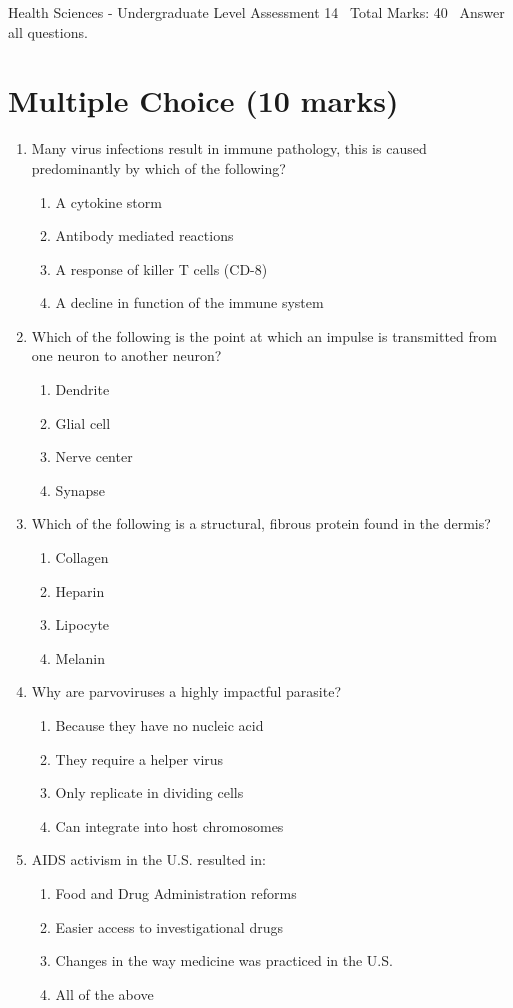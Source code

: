 \documentclass[12pt]{article}
\begin{document}
\begin{center}
Health Sciences - Undergraduate Level Assessment 14 \
Total Marks: 40 \
Answer all questions.
\end{center}

\section*{Multiple Choice (10 marks)}
\begin{enumerate}[label=\arabic*.]
\item Many virus infections result in immune pathology, this is caused predominantly by which of the following?
\begin{enumerate}[label=(\alph*)]
    \item A cytokine storm
    \item Antibody mediated reactions
    \item A response of killer T cells (CD-8)
    \item A decline in function of the immune system
\end{enumerate}
\item Which of the following is the point at which an impulse is transmitted from one neuron to another neuron?
\begin{enumerate}[label=(\alph*)]
    \item Dendrite
    \item Glial cell
    \item Nerve center
    \item Synapse
\end{enumerate}
\item Which of the following is a structural, fibrous protein found in the dermis?
\begin{enumerate}[label=(\alph*)]
    \item Collagen
    \item Heparin
    \item Lipocyte
    \item Melanin
\end{enumerate}
\item Why are parvoviruses a highly impactful parasite?
\begin{enumerate}[label=(\alph*)]
    \item Because they have no nucleic acid
    \item They require a helper virus
    \item Only replicate in dividing cells
    \item Can integrate into host chromosomes
\end{enumerate}
\item AIDS activism in the U.S. resulted in:
\begin{enumerate}[label=(\alph*)]
    \item Food and Drug Administration reforms
    \item Easier access to investigational drugs
    \item Changes in the way medicine was practiced in the U.S.
    \item All of the above
\end{enumerate}
\end{enumerate}
\end{document}
